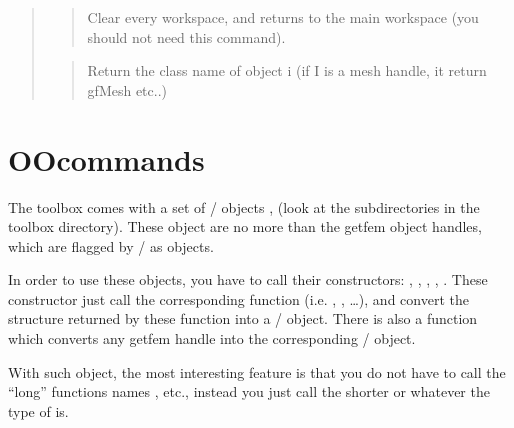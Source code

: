 \documentclass[a4paper,11pt,english]{sphinxmanual}
\begin{document}
\begin{quote}
\begin{quote}

Clear every workspace, and returns to the main workspace (you
should not need this command).
\end{quote}

\begin{quote}

Return the class name of object i (if I is a mesh handle, it
return gfMesh etc..)
\end{quote}
\end{quote}


\chapter{ OO\sphinxhyphen{}commands}
\label{\detokenize{matlab_octave/oocmd:gfm-oo-commands}}\label{\detokenize{matlab_octave/oocmd:mlab-oocmd}}\label{\detokenize{matlab_octave/oocmd::doc}}
The toolbox comes with a set of  /  objects , (look at the
 sub\sphinxhyphen{}directories in the toolbox directory). These object are no more
than the getfem object handles, which are flagged by  /  as objects.

In order to use these objects, you have to call their constructors: ,
, , , .  These constructor just
call the corresponding  function (i.e.  , , …),
and convert the structure returned by these function into a  /  object. There
is also a  function which converts any getfem handle into the
corresponding  /  object.

With such object, the most interesting feature is that you do not have to call
the “long” functions names ,
 etc., instead you just call the shorter
 or  whatever the type of  is.
\end{document}
